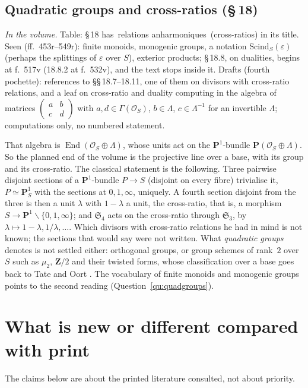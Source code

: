 \documentclass[11pt,a4paper]{amsart}
\newcommand{\q}[1]{\guillemotleft\,#1\,\guillemotright}
\newcommand{\cO}{\mathcal{O}}
\newcommand{\End}{\operatorname{End}}
\newcommand{\Pj}{\mathbf{P}}
\newcommand{\Z}{\mathbf{Z}}
\newcommand{\status}[1]{\par\smallskip\noindent\textit{In the volume.} #1\par\smallskip}
\theoremstyle{plain}
\theoremstyle{definition}
\begin{document}
\subsection{Quadratic groups and cross-ratios (\S\,18)}
\status{Table: \S\,18 has \q{relations anharmoniques} (cross-ratios) in its title. Seen (ff.~453r--549r): finite monoids, monogenic groups, a notation $\mathrm{Scind}_S(\varepsilon)$ (perhaps the splittings of $\varepsilon$ over $S$), exterior products; \S\,18.8, on dualities, begins at f.~517v (18.8.2 at f.~532v), and the text stops inside it. Drafts (fourth pochette): references to \S\S\,18.7--18.11, one of them on divisors with cross-ratio relations, and a leaf on cross-ratio and duality computing in the algebra of matrices $\left(\begin{smallmatrix}a&b\\ c&d\end{smallmatrix}\right)$ with $a,d\in\Gamma(\cO_S)$, $b\in\Lambda$, $c\in\Lambda^{-1}$ for an invertible $\Lambda$; computations only, no numbered statement.}
That algebra is $\End(\cO_S\oplus\Lambda)$, whose units act on the $\Pj^1$-bundle $\Pj(\cO_S\oplus\Lambda)$. So the planned end of the volume is the projective line over a base, with its group and its cross-ratio. The classical statement is the following. Three pairwise disjoint sections of a $\Pj^1$-bundle $P\to S$ (disjoint on every fibre) trivialise it, $P\simeq\Pj^1_S$ with the sections at $0,1,\infty$, uniquely. A fourth section disjoint from the three is then a unit $\lambda$ with $1-\lambda$ a unit, the cross-ratio, that is, a morphism $S\to\Pj^1\smallsetminus\{0,1,\infty\}$; and $\mathfrak S_4$ acts on the cross-ratio through $\mathfrak S_3$, by $\lambda\mapsto1-\lambda,1/\lambda,\dots$. Which divisors with cross-ratio relations he had in mind is not known; the sections that would say were not written. What \emph{quadratic groups} denotes is not settled either: orthogonal groups, or group schemes of rank~$2$ over $S$ such as $\mu_2$, $\Z/2$ and their twisted forms, whose classification over a base goes back to Tate and Oort \cite{tateoort}. The vocabulary of finite monoids and monogenic groups points to the second reading (Question~\ref{qu:quadgroups}).

\section{What is new or different compared with print}\label{sec:new}

The claims below are about the printed literature consulted, not about priority.
\end{document}
